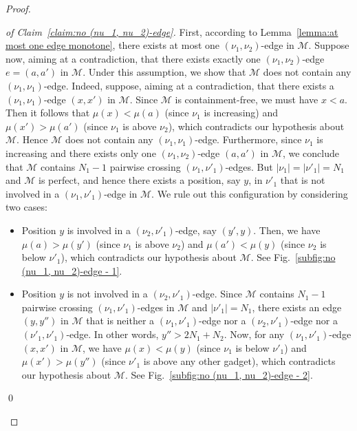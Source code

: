 \documentclass[a4paper]{llncs}
\begin{document}
\begin{proof}
  \begin{proof}[of Claim~\ref{claim:no (nu_1, nu_2)-edge}]
    First, according to Lemma~\ref{lemma:at most one edge monotone},
    there exists at most one $(\nu_1, \nu_2)$-edge in $\mathcal{M}$.
    Suppose now, aiming at a contradiction, that there exists
    exactly one $(\nu_1, \nu_2)$-edge $e = (a, a')$ in $\mathcal{M}$.
    Under this assumption, we show that $\mathcal{M}$ does not contain any $(\nu_1, \nu_1)$-edge.
    Indeed, suppose, aiming at a contradiction,
    that there exists a $(\nu_1, \nu_1)$-edge $(x, x')$ in $\mathcal{M}$.
    Since $\mathcal{M}$ is containment-free,
    we must have $x < a$.
    Then it follows that $\mu(x) < \mu(a)$ (since $\nu_1$ is increasing) and
    $\mu(x') > \mu(a')$ (since $\nu_1$ is above $\nu_2$),
    which contradicts our hypothesis about $\mathcal{M}$.
    Hence $\mathcal{M}$ does not contain any $(\nu_1, \nu_1)$-edge.
    Furthermore, since $\nu_1$ is increasing and
    there exists only one $(\nu_1, \nu_2)$-edge $(a, a')$ in $\mathcal{M}$,
    we conclude that
    $\mathcal{M}$ contains $N_1-1$ pairwise crossing $(\nu_1, \nu'_1)$-edges.
    But $|\nu_1| = |\nu'_1| = N_1$ and $\mathcal{M}$ is perfect,
    and hence there exists a position, say $y$, in $\nu'_1$ that is
    not involved in a $(\nu_1, \nu'_1)$-edge in $\mathcal{M}$.
    We rule out this configuration by considering two cases:
    \begin{itemize}
      \item Position $y$ is involved in a $(\nu_2, \nu'_1)$-edge,
      say $(y', y)$. Then, we have $\mu(a) > \mu(y')$ (since $\nu_1$ is above $\nu_2$)
      and $\mu(a') < \mu(y)$ (since $\nu_2$ is below $\nu'_1$),
      which contradicts our hypothesis about $\mathcal{M}$.
      See Fig.~\ref{subfig:no (nu_1, nu_2)-edge - 1}.
      \item Position $y$ is not involved in a $(\nu_2, \nu'_1)$-edge.
      Since $\mathcal{M}$ contains $N_1-1$ pairwise crossing $(\nu_1, \nu'_1)$-edges
      in $\mathcal{M}$ and $|\nu'_1| = N_1$, there exists an edge $(y, y'')$ in $\mathcal{M}$
      that is neither a $(\nu_1, \nu'_1)$-edge nor a $(\nu_2, \nu'_1)$-edge
      nor a $(\nu'_1, \nu'_1)$-edge.
      In other words, $y'' > 2N_1 + N_2$.
      Now, for any $(\nu_1, \nu'_1)$-edge $(x, x')$ in $\mathcal{M}$, we
      have $\mu(x) < \mu(y)$ (since $\nu_1$ is below $\nu'_1$)
      and $\mu(x') > \mu(y'')$ (since $\nu'_1$ is above any other gadget),
      which contradicts our hypothesis about $\mathcal{M}$.
      See Fig.~\ref{subfig:no (nu_1, nu_2)-edge - 2}.
    \end{itemize}
    \qed
  \end{proof}


\end{proof}
\end{document}
